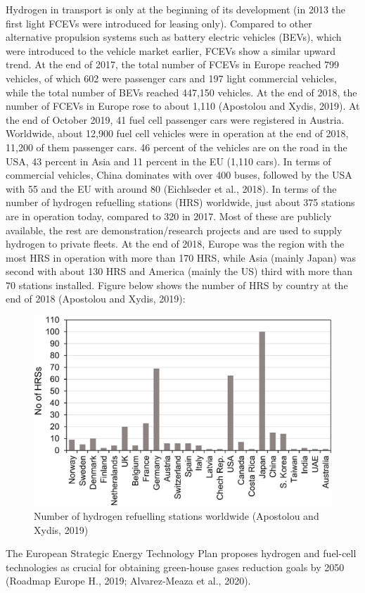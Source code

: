 \documentclass[
]{book}
\begin{document}
Hydrogen in transport is only at the beginning of its development (in 2013 the first light FCEVs were introduced for leasing only). Compared to other alternative propulsion systems such as battery electric vehicles (BEVs), which were introduced to the vehicle market earlier, FCEVs show a similar upward trend. At the end of 2017, the total number of FCEVs in Europe reached 799 vehicles, of which 602 were passenger cars and 197 light commercial vehicles, while the total number of BEVs reached 447,150 vehicles. At the end of 2018, the number of FCEVs in Europe rose to about 1,110 (Apostolou and Xydis, 2019).
At the end of October 2019, 41 fuel cell passenger cars were registered in Austria. Worldwide, about 12,900 fuel cell vehicles were in operation at the end of 2018, 11,200 of them passenger cars. 46 percent of the vehicles are on the road in the USA, 43 percent in Asia and 11 percent in the EU (1,110 cars). In terms of commercial vehicles, China dominates with over 400 buses, followed by the USA with 55 and the EU with around 80 (Eichlseder et al., 2018).
In terms of the number of hydrogen refuelling stations (HRS) worldwide, just about 375 stations are in operation today, compared to 320 in 2017. Most of these are publicly available, the rest are demonstration/research projects and are used to supply hydrogen to private fleets. At the end of 2018, Europe was the region with the most HRS in operation with more than 170 HRS, while Asia (mainly Japan) was second with about 130 HRS and America (mainly the US) third with more than 70 stations installed. Figure below shows the number of HRS by country at the end of 2018 (Apostolou and Xydis, 2019):

\begin{figure}
\includegraphics[width=0.6\linewidth]{image/hydrogen_refuel} \caption{Number of hydrogen refuelling stations worldwide (Apostolou and Xydis, 2019)}\label{fig:unnamed-chunk-17}
\end{figure}

The European Strategic Energy Technology Plan proposes hydrogen and fuel-cell technologies as crucial for obtaining green-house gases reduction goals by 2050 (Roadmap Europe H., 2019; Alvarez-Meaza et al., 2020).
\end{document}
